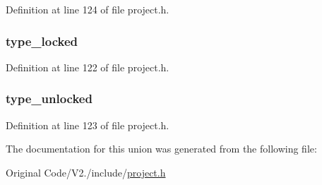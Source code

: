 \-Definition at line 124 of file project.\-h.

\hypertarget{unions__message__flags_ac13d4360deaf5e0a69a30a4b45ec42ed}{
\subsubsection[{type\-\_\-locked}]{ {\bf type\-\_\-locked}}}\label{unions__message__flags_ac13d4360deaf5e0a69a30a4b45ec42ed}


\-Definition at line 122 of file project.\-h.

\hypertarget{unions__message__flags_a4bfa5684da4ccc75b65c7f6929d6242a}{
\subsubsection[{type\-\_\-unlocked}]{ {\bf type\-\_\-unlocked}}}\label{unions__message__flags_a4bfa5684da4ccc75b65c7f6929d6242a}


\-Definition at line 123 of file project.\-h.



\-The documentation for this union was generated from the following file\-:\begin{DoxyCompactItemize}
\item 
\-Original Code/\-V2./include/\hyperlink{project_8h}{project.\-h}\end{DoxyCompactItemize}
